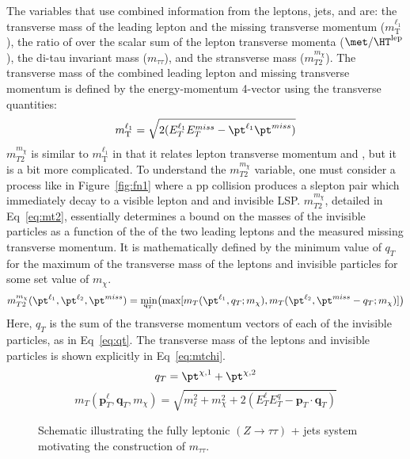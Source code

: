 The variables that use combined information from the leptons, jets, and \met{} are: the transverse mass of the leading lepton and the missing transverse momentum ($m_\text{T}^{\ell_1}$), the ratio of \met{} over the scalar sum of the lepton transverse momenta ($\met/\HT^\text{lep}$), the di-tau invariant mass ($m_{\tau\tau}$), and the stransverse mass ($m_{T2}^{m_{\chi}}$).  The transverse mass of the combined leading lepton and missing transverse momentum is defined by the energy-momentum 4-vector using the transverse quantities:
\begin{equation}
\label{eq:mt}
m_\text{T}^{\ell_1} = \sqrt{2(E^{\ell_1}_TE^{miss}_T-\pt^{\ell_1}\pt^{miss})} 
\end{equation}
$m_{T2}^{m_{\chi}}$ is similar to $m_\text{T}^{\ell_1}$ in that it relates lepton transverse momentum and \met{}, but it is a bit more complicated.  To understand the $m_{T2}^{m_{\chi}}$ variable, one must consider a process like in Figure~\ref{fig:fn1} where a pp collision produces a slepton pair  which immediately decay to a visible lepton and and invisible LSP.  $m_{T2}^{m_{\chi}}$, detailed in Eq~\ref{eq:mt2}, essentially determines a bound on the masses of the invisible particles as a function of the \pt of the two leading leptons and the measured missing transverse momentum.  It is mathematically defined by the minimum value of $q_T$ for the maximum of the transverse mass of the leptons and invisible particles for some set value of $m_\chi$.  
\begin{equation}
\label{eq:mt2}
m^{m_\chi}_{T2}(\pt^{\ell_1}, \pt^{\ell_2}, \pt^{miss})  = \underaccent{\mathbf{q}_T}{\text{min}}\big(\text{max}[m_T(\pt^{\ell_1}, q_T; m_\chi), m_T(\pt^{\ell_2}, \pt^{miss}-q_T; m_\chi)]\big)
\end{equation}
Here, $q_T$ is the sum of the transverse momentum vectors of each of the invisible particles, as in Eq~\ref{eq:qt}.  The transverse mass of the leptons and invisible particles is shown explicitly in Eq~\ref{eq:mtchi}.
\begin{equation}
\label{eq:qt}
q_T = \pt^{\chi,1}+\pt^{\chi,2}
\end{equation}
\begin{equation}
 m_T\left(\mathbf{p}_T^{\ell}, \mathbf{q}_T, m_\chi\right)= \sqrt{m_\ell^2 + m_\chi^2 + 2\left(E_T^\ell E_T^q -\mathbf{p}_T\cdot \mathbf{q}_T\right)}
 \label{eq:mtchi}
 \end{equation}
   \begin{figure}
  \centering
  
  \caption{Schematic illustrating the fully leptonic $(Z\to\tau\tau)$ + jets system motivating the construction of $m_{\tau\tau}$. }
  \label{fig:ditau_schematic}
  \end{figure}
